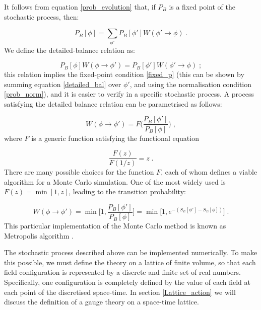 It follows from equation \ref{prob_evolution} that, if $P_B$ is a fixed point of the stochastic process, then:

\begin{equation}
P_B[\phi] = \sum_{\phi'} P_B[\phi'] W(\phi' \to \phi) \; .
\label{fixed_p}
\end{equation}
%
We define the detailed-balance relation as:

\begin{equation}
P_B[\phi] W(\phi \to \phi') = P_B[\phi'] W(\phi' \to \phi) \; ;
\label{detailed_bal}
\end{equation}
%
this relation implies the fixed-point condition \ref{fixed_p} (this can be shown by summing equation \ref{detailed_bal} over $\phi'$, and using the normalisation condition \ref{prob_norm}), and it is easier to verify in a specific stochastic process. A process satisfying the detailed balance relation can be parametrised as follows:

\begin{equation}
W(\phi \to \phi') = F\biggl(\frac{P_B[\phi']}{P_B[\phi]} \biggr) \; ,
\label{F1}
\end{equation}
%
where $F$ is a generic function satisfying the functional equation

\begin{equation}
\frac{F(z)}{F(1/z)} = z \; .
\label{F2}
\end{equation}
%
There are many possible choices for the function $F$, each of whom defines a viable algorithm for a Monte Carlo simulation. One of the most widely used is $F(z) = \min [1,z]$, leading to the transition probability:

\begin{equation}
W(\phi \to \phi') = \min\biggl[1, \frac{P_B[\phi']}{P_B[\phi]}\biggl] = \min\bigl[1,e^{-(S_E[\phi'] - S_E[\phi])}\bigr] \; .
\label{Metropolis}
\end{equation}
%
This particular implementation of the Monte Carlo method is known as Metropolis algorithm \cite{Metropolis:1953am}.

The stochastic process described above can be implemented numerically. To make this possible, we must define the theory on a lattice of finite volume, so that each field configuration is represented by a discrete and finite set of real numbers. Specifically, one configuration is completely defined by the value of each field at each point of the discretised space-time.  In section \ref{Lattice_action} we will discuss the definition of a gauge theory on a space-time lattice.

